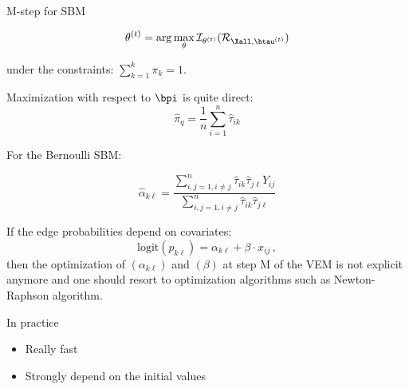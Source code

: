 \documentclass[compress,10pt]{beamer}
\begin{document}
 \begin{frame}[allowframebreaks]{M-step for SBM}

$$\theta^{(t)} = \arg \max_{\theta}   \mathcal{I}_{\theta^{(t)}}(\mathcal{R}_{\Xall, \btau^{(t)}}) $$

under the constraints: $ \sum_{k=1}^k \pi_k=1.$


Maximization with respect to $\bpi$ is quite direct:
$$
\widehat{\pi}_q = \frac{1}{n} \sum_{i=1}^n \widehat{\tau}_{ik}
$$ 
 
For the Bernoulli SBM: 

$$
\widehat{\alpha}_{k\ell} = \frac{\sum_{i,j=1,i\neq j}^n \widehat{\tau}_{ik}  \widehat{\tau}_{j\ell} Y_{ij}}{\sum_{i,j=1,i\neq j}^n  \widehat{\tau}_{ik}  \widehat{\tau}_{j\ell} }
$$

If the edge probabilities depend on covariates:
\begin{equation}
 \nonumber
 \mbox{logit}(p_{k\ell}) = \alpha_{k\ell} +  \beta \cdot x_{ij}\,,
\end{equation}
then the optimization of $ (\alpha_{k\ell})$ and $ (\beta)$ at step M of the VEM is not explicit anymore and one should resort  to optimization algorithms such as Newton-Raphson
algorithm.  
 
 \end{frame}
\begin{frame}{In practice}
\begin{itemize}
\item Really fast
\item Strongly depend on the initial values
\end{itemize}

\end{frame}
\end{document}
